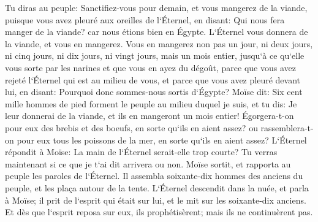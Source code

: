 \verse Tu diras au peuple: Sanctifiez-vous pour demain, et vous mangerez de la viande, puisque vous avez pleuré aux oreilles de l`Éternel, en disant: Qui nous fera manger de la viande? car nous étions bien en Égypte. L`Éternel vous donnera de la viande, et vous en mangerez. 
\verse Vous en mangerez non pas un jour, ni deux jours, ni cinq jours, ni dix jours, ni vingt jours, 
\verse mais un mois entier, jusqu`à ce qu`elle vous sorte par les narines et que vous en ayez du dégoût, parce que vous avez rejeté l`Éternel qui est au milieu de vous, et parce que vous avez pleuré devant lui, en disant: Pourquoi donc sommes-nous sortis d`Égypte? 
\verse Moïse dit: Six cent mille hommes de pied forment le peuple au milieu duquel je suis, et tu dis: Je leur donnerai de la viande, et ils en mangeront un mois entier! 
\verse Égorgera-t-on pour eux des brebis et des boeufs, en sorte qu`ils en aient assez? ou rassemblera-t-on pour eux tous les poissons de la mer, en sorte qu`ils en aient assez? 
\verse L`Éternel répondit à Moïse: La main de l`Éternel serait-elle trop courte? Tu verras maintenant si ce que je t`ai dit arrivera ou non. 
\verse Moïse sortit, et rapporta au peuple les paroles de l`Éternel. Il assembla soixante-dix hommes des anciens du peuple, et les plaça autour de la tente. 
\verse L`Éternel descendit dans la nuée, et parla à Moïse; il prit de l`esprit qui était sur lui, et le mit sur les soixante-dix anciens. Et dès que l`esprit reposa sur eux, ils prophétisèrent; mais ils ne continuèrent pas. 
